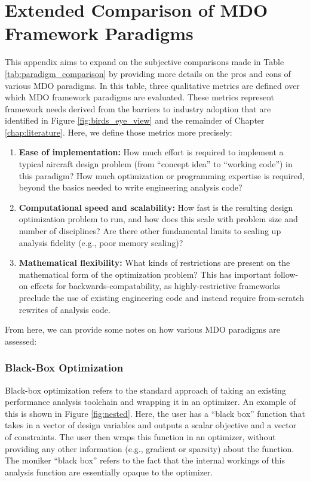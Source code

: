 \chapter{Extended Comparison of MDO Framework Paradigms}
\label{chap:paradigm_comparison}

This appendix aims to expand on the subjective comparisons made in Table \ref{tab:paradigm_comparison} by providing more details on the pros and cons of various MDO paradigms. In this table, three qualitative metrics are defined over which MDO framework paradigms are evaluated. These metrics represent framework needs derived from the barriers to industry adoption that are identified in Figure \ref{fig:birds_eye_view} and the remainder of Chapter \ref{chap:literature}. Here, we define those metrics more precisely:

\begin{enumerate}
    \item \textbf{Ease of implementation:} How much effort is required to implement a typical aircraft design problem (from ``concept idea'' to ``working code'') in this paradigm? How much optimization or programming expertise is required, beyond the basics needed to write engineering analysis code?
    \item \textbf{Computational speed and scalability:} How fast is the resulting design optimization problem to run, and how does this scale with problem size and number of disciplines? Are there other fundamental limits to scaling up analysis fidelity (e.g., poor memory scaling)?
    \item \textbf{Mathematical flexibility:} What kinds of restrictions are present on the mathematical form of the optimization problem? This has important follow-on effects for backwards-compatability, as highly-restrictive frameworks preclude the use of existing engineering code and instead require from-scratch rewrites of analysis code.
\end{enumerate}

\noindent From here, we can provide some notes on how various MDO paradigms are assessed:

\subsection*{Black-Box Optimization}

Black-box optimization refers to the standard approach of taking an existing performance analysis toolchain and wrapping it in an optimizer. An example of this is shown in Figure \ref{fig:nested}. Here, the user has a ``black box'' function that takes in a vector of design variables and outputs a scalar objective and a vector of constraints. The user then wraps this function in an optimizer, without providing any other information (e.g., gradient or sparsity) about the function. The moniker ``black box'' refers to the fact that the internal workings of this analysis function are essentially opaque to the optimizer.


